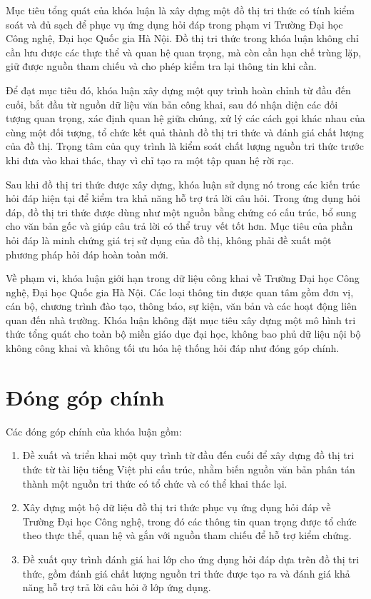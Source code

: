 Mục tiêu tổng quát của khóa luận là xây dựng một đồ thị tri thức có tính kiểm soát và đủ sạch để phục vụ ứng dụng hỏi đáp trong phạm vi Trường Đại học Công nghệ, Đại học Quốc gia Hà Nội. Đồ thị tri thức trong khóa luận không chỉ cần lưu được các thực thể và quan hệ quan trọng, mà còn cần hạn chế trùng lặp, giữ được nguồn tham chiếu và cho phép kiểm tra lại thông tin khi cần.

Để đạt mục tiêu đó, khóa luận xây dựng một quy trình hoàn chỉnh từ đầu đến cuối, bắt đầu từ nguồn dữ liệu văn bản công khai, sau đó nhận diện các đối tượng quan trọng, xác định quan hệ giữa chúng, xử lý các cách gọi khác nhau của cùng một đối tượng, tổ chức kết quả thành đồ thị tri thức và đánh giá chất lượng của đồ thị. Trọng tâm của quy trình là kiểm soát chất lượng nguồn tri thức trước khi đưa vào khai thác, thay vì chỉ tạo ra một tập quan hệ rời rạc.

Sau khi đồ thị tri thức được xây dựng, khóa luận sử dụng nó trong các kiến trúc hỏi đáp hiện tại để kiểm tra khả năng hỗ trợ trả lời câu hỏi. Trong ứng dụng hỏi đáp, đồ thị tri thức được dùng như một nguồn bằng chứng có cấu trúc, bổ sung cho văn bản gốc và giúp câu trả lời có thể truy vết tốt hơn. Mục tiêu của phần hỏi đáp là minh chứng giá trị sử dụng của đồ thị, không phải đề xuất một phương pháp hỏi đáp hoàn toàn mới.

Về phạm vi, khóa luận giới hạn trong dữ liệu công khai về Trường Đại học Công nghệ, Đại học Quốc gia Hà Nội. Các loại thông tin được quan tâm gồm đơn vị, cán bộ, chương trình đào tạo, thông báo, sự kiện, văn bản và các hoạt động liên quan đến nhà trường. Khóa luận không đặt mục tiêu xây dựng một mô hình tri thức tổng quát cho toàn bộ miền giáo dục đại học, không bao phủ dữ liệu nội bộ không công khai và không tối ưu hóa hệ thống hỏi đáp như đóng góp chính.

\section{Đóng góp chính}

Các đóng góp chính của khóa luận gồm:

\begin{enumerate}
    \item Đề xuất và triển khai một quy trình từ đầu đến cuối để xây dựng đồ thị tri thức từ tài liệu tiếng Việt phi cấu trúc, nhằm biến nguồn văn bản phân tán thành một nguồn tri thức có tổ chức và có thể khai thác lại.
    \item Xây dựng một bộ dữ liệu đồ thị tri thức phục vụ ứng dụng hỏi đáp về Trường Đại học Công nghệ, trong đó các thông tin quan trọng được tổ chức theo thực thể, quan hệ và gắn với nguồn tham chiếu để hỗ trợ kiểm chứng.
    \item Đề xuất quy trình đánh giá hai lớp cho ứng dụng hỏi đáp dựa trên đồ thị tri thức, gồm đánh giá chất lượng nguồn tri thức được tạo ra và đánh giá khả năng hỗ trợ trả lời câu hỏi ở lớp ứng dụng.
\end{enumerate}

